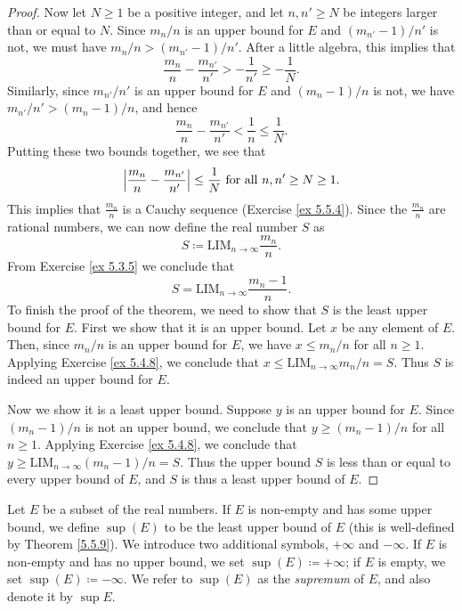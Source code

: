 \begin{proof}
    Now let \(N \geq 1\) be a positive integer, and let \(n, n' \geq N\) be integers larger than or equal to \(N\).
    Since \(m_n / n\) is an upper bound for \(E\) and \((m_{n'} - 1) / n'\) is not, we must have \(m_n / n > (m_{n'} - 1) / n'\).
    After a little algebra, this implies that
    \[
        \frac{m_n}{n} - \frac{m_{n'}}{n'} > -\frac{1}{n'} \geq -\frac{1}{N}.
    \]
    Similarly, since \(m_{n'} / n'\) is an upper bound for \(E\) and \((m_n - 1) / n\) is not, we have \(m_{n'} / n' > (m_n - 1) / n\), and hence
    \[
        \frac{m_n}{n} - \frac{m_{n'}}{n'} < \frac{1}{n} \leq \frac{1}{N}.
    \]
    Putting these two bounds together, we see that
    \[
        \left\lvert\frac{m_n}{n} - \frac{m_{n'}}{n'}\right\rvert \leq \frac{1}{N} \text{ for all } n, n' \geq N \geq 1.
    \]
    This implies that \(\frac{m_n}{n}\) is a Cauchy sequence (Exercise \ref{ex 5.5.4}).
    Since the \(\frac{m_n}{n}\) are rational numbers, we can now define the real number \(S\) as
    \[
        S \coloneqq \text{LIM}_{n \to \infty} \frac{m_n}{n}.
    \]
    From Exercise \ref{ex 5.3.5} we conclude that
    \[
        S = \text{LIM}_{n \to \infty} \frac{m_n - 1}{n}.
    \]
    To finish the proof of the theorem, we need to show that \(S\) is the least upper bound for \(E\).
    First we show that it is an upper bound.
    Let \(x\) be any element of \(E\).
    Then, since \(m_n / n\) is an upper bound for \(E\), we have \(x \leq m_n / n\) for all \(n \geq 1\).
    Applying Exercise \ref{ex 5.4.8}, we conclude that \(x \leq \text{LIM}_{n \to \infty} m_n / n = S\).
    Thus \(S\) is indeed an upper bound for \(E\).

    Now we show it is a least upper bound.
    Suppose \(y\) is an upper bound for \(E\).
    Since \((m_n - 1) / n\) is not an upper bound, we conclude that \(y \geq (m_n - 1) / n\) for all \(n \geq 1\).
    Applying Exercise \ref{ex 5.4.8}, we conclude that \(y \geq \text{LIM}_{n \to \infty} (m_n - 1) / n = S\).
    Thus the upper bound \(S\) is less than or equal to every upper bound of \(E\), and \(S\) is thus a least upper bound of \(E\).
\end{proof}

\begin{definition}[Supremum]\label{5.5.10}
    Let \(E\) be a subset of the real numbers.
    If \(E\) is non-empty and has some upper bound, we define \(\sup(E)\) to be the least upper bound of \(E\)
    (this is well-defined by Theorem \ref{5.5.9}).
    We introduce two additional symbols, \(+\infty\) and \(-\infty\).
    If \(E\) is non-empty and has no upper bound, we set \(\sup(E) \coloneqq +\infty\);
    if \(E\) is empty, we set \(\sup(E) \coloneqq -\infty\).
    We refer to \(\sup(E)\) as the \emph{supremum} of \(E\), and also denote it by \(\sup E\).
\end{definition}

